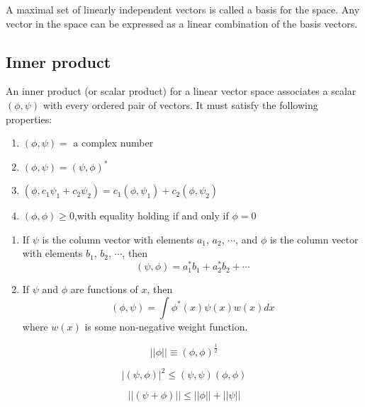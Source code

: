 \begin{newdef}[Base]
A maximal set of linearly independent vectors is called a basis for the space. Any vector in the space can be expressed as a linear combination of the basis vectors.
\end{newdef}

\subsection{Inner product}
\begin{newdef}
An inner product (or scalar product) for a linear vector space associates a scalar $(\phi,\psi)$ with every ordered pair of vectors. 
It must satisfy the following properties:
\begin{enumerate}
\item $(\phi,\psi) = $ a complex number
\item $(\phi,\psi) = (\psi,\phi)^*$
\item $(\phi,c_1\psi_1 + c_2\psi_2) = c_1(\phi,\psi_1) + c_2(\phi,\psi_2)$
\item $(\phi,\phi) \geq 0$,with equality holding if and only if $\phi=0$
\end{enumerate}
\end{newdef}

\begin{example}
\begin{enumerate}
\item If $\psi$ is the column vector with elements $a_1$, $a_2$, $\cdots$, and $\phi$ is the column vector with elements $b_1$, $b_2$, $\cdots$, then
\[(\psi,\phi) = a_1^*b_1 + a_2^*b_2 + \cdots\]
\item If $\psi$ and $\phi$ are functions of $x$, then
\[(\phi,\psi) = \int \phi^*(x) \psi(x) w(x) dx\]
where $w(x)$ is some non-negative weight function.
\end{enumerate}
\end{example}

\begin{newdef}[Norm]
\[|| \phi || \equiv (\phi,\phi)^{\frac{1}{2}}\]
\end{newdef}

\begin{newthem}
\[|(\psi,\phi)|^2 \leq (\psi,\psi)(\phi,\phi)\]
\end{newthem}

\begin{newthem}
\[||(\psi+\phi)|| \leq ||\phi|| + ||\psi||\]
\end{newthem}

